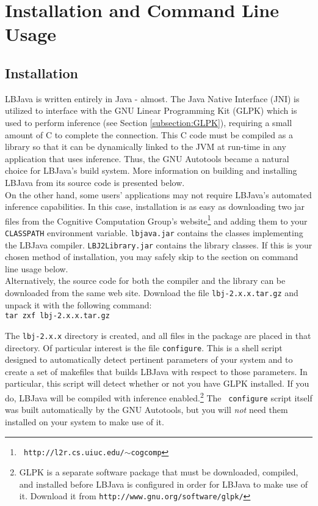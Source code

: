 
\chapter{Installation and Command Line Usage}

\section{Installation} \label{section:installation}

LBJava is written entirely in Java - almost.  The Java Native Interface (JNI) is
utilized to interface with the GNU Linear Programming Kit (GLPK) which is used
to perform inference (see Section \ref{subsection:GLPK}), requiring a small
amount of C to complete the connection.  This C code must be compiled as a
library so that it can be dynamically linked to the JVM at run-time in any
application that uses inference.  Thus, the GNU Autotools became a natural
choice for LBJava's build system.  More information on building and installing
LBJava from its source code is presented below. \\

On the other hand, some users' applications may not require LBJava's automated
inference capabilities.  In this case, installation is as easy as downloading
two jar files from the Cognitive Computation Group's website\footnote{{\tt
http://l2r.cs.uiuc.edu/$\sim$cogcomp}} and adding them to your {\tt CLASSPATH}
environment variable.  {\tt lbjava.jar} contains the classes implementing the
LBJava compiler.  {\tt LBJ2Library.jar} contains the library classes.  If this is
your chosen method of installation, you may safely skip to the section on
command line usage below. \\

Alternatively, the source code for both the compiler and the library can be
downloaded from the same web site.  Download the file {\tt lbj-2.x.x.tar.gz}
and unpack it with the following command: \\

\vspace{-.25cm}
{\tt tar zxf lbj-2.x.x.tar.gz} \\
\vspace{-.25cm}

\noindent
The {\tt lbj-2.x.x} directory is created, and all files in the package are
placed in that directory.  Of particular interest is the file {\tt configure}.
This is a shell script designed to automatically detect pertinent parameters
of your system and to create a set of makefiles that builds LBJava with respect
to those parameters.  In particular, this script will detect whether or not
you have GLPK installed.  If you do, LBJava will be compiled with inference
enabled.\footnote{GLPK is a separate software package that must be downloaded,
compiled, and installed before LBJava is configured in order for LBJava to make use
of it.  Download it from {\tt http://www.gnu.org/software/glpk/}}  The {\tt
configure} script itself was built automatically by the GNU Autotools, but you
will \emph{not} need them installed on your system to make use of it. \\

